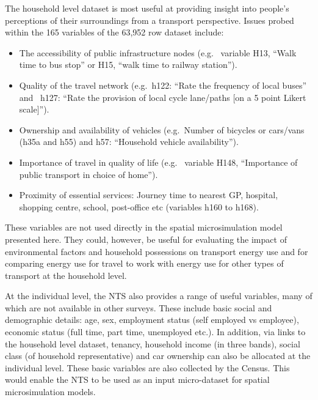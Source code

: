 \documentclass[a4paper, 11pt, twoside]{Thesis}
\begin{document}
The household level dataset is most useful at providing insight into people's
perceptions of their surroundings from a transport perspective. Issues probed
within the 165 variables of the 63,952 row dataset include:
\begin{itemize}
 \item The accessibility of public infrastructure nodes (e.g.~ variable H13,
``Walk time to bus stop'' or H15, ``walk time to railway station'').
\item Quality of the travel network (e.g.~h122: ``Rate the frequency of local
buses'' and  ~h127: ``Rate the provision of local cycle lane/paths [on a 5 point
Likert scale]'').
\item Ownership and availability of vehicles (e.g.~Number of bicycles or
cars/vans (h35a and h55) and h57: ``Household vehicle availability'').
\item Importance of travel in quality of life (e.g.~ variable H148, ``Importance
of public transport in choice of home'').
\item Proximity of essential services:
Journey time to nearest GP, hospital, shopping centre, school, post-office
etc (variables h160 to h168).
\end{itemize}
These variables are not used directly in the spatial microsimulation model
presented here. They could, however, be useful for evaluating the
impact of
environmental factors and household possessions on transport energy use and for
comparing energy use for travel to work with energy use for other types of
transport at the household level. 

At the individual level, the NTS also provides a range of useful
variables, many of which are not available in other surveys. These include basic
social and demographic
details: age, sex, employment status (self employed vs employee), economic
status (full time, part time, unemployed etc.). In addition, via links to the
household level dataset, tenancy, household income (in three bands), social
class (of household representative) and car ownership can also be allocated at
the individual level.
These basic variables are also collected by the Census. This would enable
the NTS to be used as an input micro-dataset for spatial microsimulation models.
\end{document}

